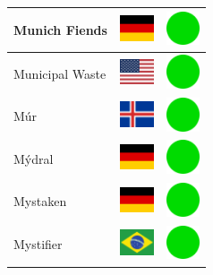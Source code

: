 \documentclass[12pt, a4paper, twoside]{report}
\begin{document}
\begin{center}
\begin{longtable}{|p{5cm}|p{2cm}|p{2cm}|}
 Munich Fiends                                              & \includegraphics[width=1cm]{../4x3/de} &   \includegraphics[width=1cm]{../likes/y} \\ \hline
 Municipal Waste                                            & \includegraphics[width=1cm]{../4x3/us} &   \includegraphics[width=1cm]{../likes/y} \\ \hline
 Múr                                                        & \includegraphics[width=1cm]{../4x3/is} &   \includegraphics[width=1cm]{../likes/y} \\ \hline
 Mýdral                                                     & \includegraphics[width=1cm]{../4x3/de} &   \includegraphics[width=1cm]{../likes/y} \\ \hline
 Mystaken                                                   & \includegraphics[width=1cm]{../4x3/de} &   \includegraphics[width=1cm]{../likes/y} \\ \hline
 Mystifier                                                  & \includegraphics[width=1cm]{../4x3/br} &   \includegraphics[width=1cm]{../likes/y} \\ \hline

\end{longtable}
\end{center}
\end{document}
